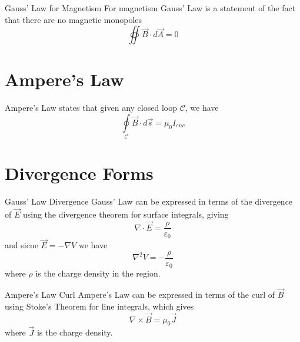 \documentclass[12pt]{report}
\begin{document}
\begin{thm}{Gauss' Law for Magnetism}{}
        For magnetism Gauss' Law is a statement of the fact that there are no magnetic monopoles \begin{equation}
                \oiint\limits \vec{B} \cdot d\vec{A} = 0
        \end{equation}
\end{thm}

\section{Ampere's Law}


\begin{thm}{Ampere's Law}{}
         states that given any closed loop $\mathcal{C}$, we have \begin{equation}
                \oint\limits_{\mathcal{C}} \vec{B}\cdot d\vec{s} = \mu_0I_{enc}
        \end{equation}
\end{thm}

\section{Divergence Forms}

\begin{defn}{Gauss' Law Divergence}{}
        Gauss' Law can be expressed in terms of the divergence of $\vec{E}$ using the divergence theorem for surface integrals, giving \begin{equation}
                \nabla \cdot \vec{E} = \frac{\rho}{\varepsilon_0}
        \end{equation}
        and sicne $\vec{E} = -\nabla V$ we have \begin{equation}
                \nabla^2V = -\frac{\rho}{\varepsilon_0}
        \end{equation}
        where $\rho$ is the charge density in the region.
\end{defn}


\begin{defn}{Ampere's Law Curl}{}
        Ampere's Law can be expressed in terms of the curl of $\vec{B}$ using Stoke's Theorem for line integrals, which gives \begin{equation}
                \nabla \times \vec{B} = \mu_0 \vec{J}
        \end{equation}
        where $\vec{J}$ is the charge density.
\end{defn}
\end{document}
